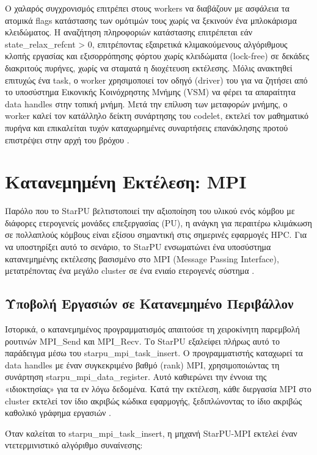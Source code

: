 Ο χαλαρός συγχρονισμός επιτρέπει στους workers να διαβάζουν με ασφάλεια τα ατομικά flags κατάστασης των ομότιμών τους χωρίς να ξεκινούν ένα μπλοκάρισμα κλειδώματος. Η αναζήτηση πληροφοριών κατάστασης επιτρέπεται εάν state\_relax\_refcnt > 0, επιτρέποντας εξαιρετικά κλιμακούμενους αλγόριθμους κλοπής εργασίας και εξισορρόπησης φόρτου χωρίς κλειδώματα (lock-free) σε δεκάδες διακριτούς πυρήνες, χωρίς να σταματά η διοχέτευση εκτέλεσης. Μόλις ανακτηθεί επιτυχώς ένα task, ο worker χρησιμοποιεί τον οδηγό (driver) του για να ζητήσει από το υποσύστημα Εικονικής Κοινόχρηστης Μνήμης (VSM) να φέρει τα απαραίτητα data handles στην τοπική μνήμη. Μετά την επίλυση των μεταφορών μνήμης, ο worker καλεί τον κατάλληλο δείκτη συνάρτησης του codelet, εκτελεί τον μαθηματικό πυρήνα και επικαλείται τυχόν καταχωρημένες συναρτήσεις επανάκλησης προτού επιστρέψει στην αρχή του βρόχου \cite{starpu_dev_manual}.

\section{Κατανεμημένη Εκτέλεση: MPI}

Παρόλο που το StarPU βελτιστοποιεί την αξιοποίηση του υλικού ενός κόμβου με διάφορες ετερογενείς μονάδες επεξεργασίας (PU), η ανάγκη για περαιτέρω κλιμάκωση σε πολλαπλούς κόμβους είναι εξίσου σημαντική στις σημερινές εφαρμογές HPC. Για να υποστηρίξει αυτό το σενάριο, το StarPU ενσωματώνει ένα υποσύστημα κατανεμημένης εκτέλεσης βασισμένο στο MPI (Message Passing Interface), μετατρέποντας ένα μεγάλο cluster σε ένα ενιαίο ετερογενές σύστημα \cite{starpu2025handbook, starpu_dev_manual}.

\subsection{Υποβολή Εργασιών σε Κατανεμημένο Περιβάλλον}

Ιστορικά, ο κατανεμημένος προγραμματισμός απαιτούσε τη χειροκίνητη παρεμβολή ρουτινών MPI\_Send και MPI\_Recv. Το StarPU εξαλείφει πλήρως αυτό το παράδειγμα μέσω του starpu\_mpi\_task\_insert. Ο προγραμματιστής καταχωρεί τα data handles με έναν συγκεκριμένο βαθμό (rank) MPI, χρησιμοποιώντας τη συνάρτηση starpu\_mpi\_data\_register. Αυτό καθιερώνει την έννοια της «ιδιοκτησίας» για τα εν λόγω δεδομένα. Κατά την εκτέλεση, κάθε διεργασία MPI στο cluster εκτελεί τον ίδιο ακριβώς κώδικα εφαρμογής, ξεδιπλώνοντας το ίδιο ακριβώς καθολικό γράφημα εργασιών \cite{starpu2025handbook}.

Όταν καλείται το starpu\_mpi\_task\_insert, η μηχανή StarPU-MPI εκτελεί έναν ντετερμινιστικό αλγόριθμο συναίνεσης:

